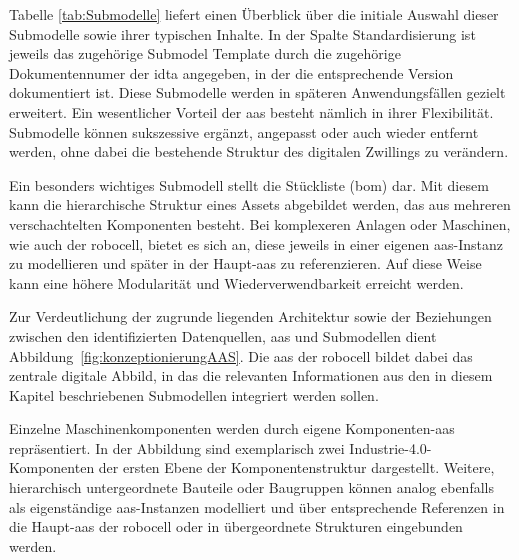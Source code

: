 Tabelle \ref{tab:Submodelle} liefert einen Überblick über die initiale Auswahl dieser Submodelle sowie ihrer typischen Inhalte.
In der Spalte Standardisierung ist jeweils das zugehörige Submodel Template durch die zugehörige Dokumentennumer der \acs{idta} angegeben, in der die entsprechende Version dokumentiert ist.
Diese Submodelle werden in späteren Anwendungsfällen gezielt erweitert.
Ein wesentlicher Vorteil der \acs{aas} besteht nämlich in ihrer Flexibilität.
Submodelle können sukszessive ergänzt, angepasst oder auch wieder entfernt werden, ohne dabei die bestehende Struktur des digitalen Zwillings zu verändern.




Ein besonders wichtiges Submodell stellt die Stückliste (\acs{bom}) dar. 
Mit diesem kann die hierarchische Struktur eines Assets abgebildet werden, das aus mehreren verschachtelten Komponenten besteht.
Bei komplexeren Anlagen oder Maschinen, wie auch der robocell, bietet es sich an, diese jeweils in einer eigenen \acs{aas}-Instanz zu modellieren und später in der Haupt-\acs{aas} zu referenzieren.
Auf diese Weise kann eine höhere Modularität und Wiederverwendbarkeit erreicht werden.

Zur Verdeutlichung der zugrunde liegenden Architektur sowie der Beziehungen zwischen den identifizierten Datenquellen, \acs{aas} und Submodellen dient Abbildung~\ref{fig:konzeptionierungAAS}. 
Die \acs{aas} der robocell bildet dabei das zentrale digitale Abbild, in das die relevanten Informationen aus den in diesem Kapitel beschriebenen Submodellen integriert werden sollen.

Einzelne Maschinenkomponenten werden durch eigene Komponenten-\acs{aas} repräsentiert. 
In der Abbildung sind exemplarisch zwei Industrie-4.0-Komponenten der ersten Ebene der Komponentenstruktur dargestellt. 
Weitere, hierarchisch untergeordnete Bauteile oder Baugruppen können analog ebenfalls als eigenständige \acs{aas}-Instanzen modelliert und über entsprechende Referenzen in die Haupt-\acs{aas} der robocell oder in übergeordnete Strukturen eingebunden werden.

